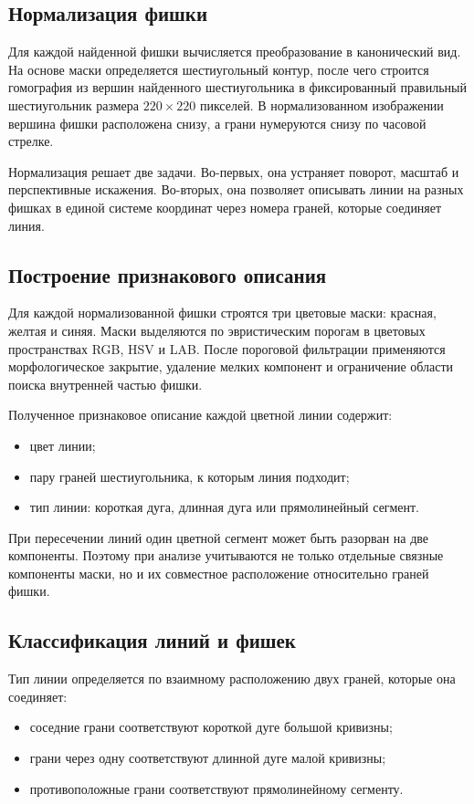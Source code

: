 \documentclass[12pt,a4paper]{article}
\begin{document}
\subsection{Нормализация фишки}
Для каждой найденной фишки вычисляется преобразование в канонический вид. На основе маски определяется шестиугольный контур, после чего строится гомография из вершин найденного шестиугольника в фиксированный правильный шестиугольник размера $220 \times 220$ пикселей. В нормализованном изображении вершина фишки расположена снизу, а грани нумеруются снизу по часовой стрелке.

Нормализация решает две задачи. Во-первых, она устраняет поворот, масштаб и перспективные искажения. Во-вторых, она позволяет описывать линии на разных фишках в единой системе координат через номера граней, которые соединяет линия.

\subsection{Построение признакового описания}
Для каждой нормализованной фишки строятся три цветовые маски: красная, желтая и синяя. Маски выделяются по эвристическим порогам в цветовых пространствах RGB, HSV и LAB. После пороговой фильтрации применяются морфологическое закрытие, удаление мелких компонент и ограничение области поиска внутренней частью фишки.

Полученное признаковое описание каждой цветной линии содержит:
\begin{itemize}[leftmargin=1.2cm]
    \item цвет линии;
    \item пару граней шестиугольника, к которым линия подходит;
    \item тип линии: короткая дуга, длинная дуга или прямолинейный сегмент.
\end{itemize}

При пересечении линий один цветной сегмент может быть разорван на две компоненты. Поэтому при анализе учитываются не только отдельные связные компоненты маски, но и их совместное расположение относительно граней фишки.

\subsection{Классификация линий и фишек}
Тип линии определяется по взаимному расположению двух граней, которые она соединяет:
\begin{itemize}[leftmargin=1.2cm]
    \item соседние грани соответствуют короткой дуге большой кривизны;
    \item грани через одну соответствуют длинной дуге малой кривизны;
    \item противоположные грани соответствуют прямолинейному сегменту.
\end{itemize}
\end{document}
